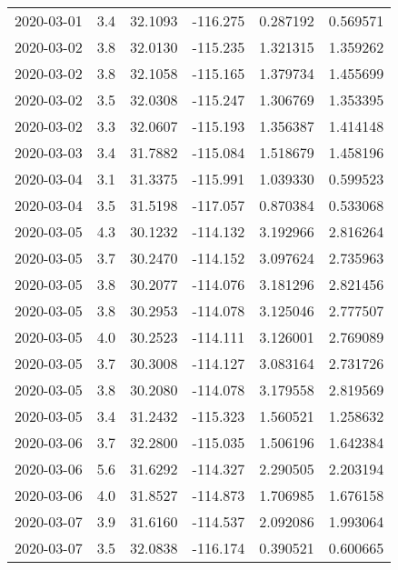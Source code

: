 \begin{tabular}{lrrrrr}
2020-03-01 &       3.4 &  32.1093 &  -116.275 &         0.287192 &         0.569571 \\
2020-03-02 &       3.8 &  32.0130 &  -115.235 &         1.321315 &         1.359262 \\
2020-03-02 &       3.8 &  32.1058 &  -115.165 &         1.379734 &         1.455699 \\
2020-03-02 &       3.5 &  32.0308 &  -115.247 &         1.306769 &         1.353395 \\
2020-03-02 &       3.3 &  32.0607 &  -115.193 &         1.356387 &         1.414148 \\
2020-03-03 &       3.4 &  31.7882 &  -115.084 &         1.518679 &         1.458196 \\
2020-03-04 &       3.1 &  31.3375 &  -115.991 &         1.039330 &         0.599523 \\
2020-03-04 &       3.5 &  31.5198 &  -117.057 &         0.870384 &         0.533068 \\
2020-03-05 &       4.3 &  30.1232 &  -114.132 &         3.192966 &         2.816264 \\
2020-03-05 &       3.7 &  30.2470 &  -114.152 &         3.097624 &         2.735963 \\
2020-03-05 &       3.8 &  30.2077 &  -114.076 &         3.181296 &         2.821456 \\
2020-03-05 &       3.8 &  30.2953 &  -114.078 &         3.125046 &         2.777507 \\
2020-03-05 &       4.0 &  30.2523 &  -114.111 &         3.126001 &         2.769089 \\
2020-03-05 &       3.7 &  30.3008 &  -114.127 &         3.083164 &         2.731726 \\
2020-03-05 &       3.8 &  30.2080 &  -114.078 &         3.179558 &         2.819569 \\
2020-03-05 &       3.4 &  31.2432 &  -115.323 &         1.560521 &         1.258632 \\
2020-03-06 &       3.7 &  32.2800 &  -115.035 &         1.506196 &         1.642384 \\
2020-03-06 &       5.6 &  31.6292 &  -114.327 &         2.290505 &         2.203194 \\
2020-03-06 &       4.0 &  31.8527 &  -114.873 &         1.706985 &         1.676158 \\
2020-03-07 &       3.9 &  31.6160 &  -114.537 &         2.092086 &         1.993064 \\
2020-03-07 &       3.5 &  32.0838 &  -116.174 &         0.390521 &         0.600665 \\

\end{tabular}
